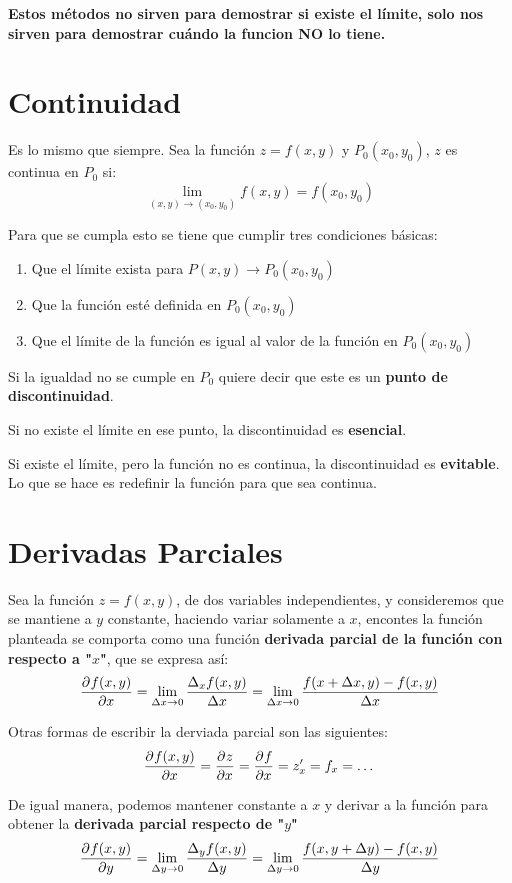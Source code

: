 \documentclass[12pt]{article}
\begin{document}
\textbf{Estos métodos no sirven para demostrar si existe el límite, solo nos sirven para demostrar cuándo la funcion NO lo tiene.}

\section{Continuidad}
Es lo mismo que siempre. Sea la función $ z = f(x,y) $ y $ P_{0}(x_{0}, y_{0}) $, $ z $ es continua en $ P_{0} $ si:
\[
\lim_{(x,y) \to (x_{0},y_{0})}{f(x,y)} = f(x_{0},y_{0})
\]

Para que se cumpla esto se tiene que cumplir tres condiciones básicas:
\begin{enumerate}[1.]
  \item Que el límite exista para $ P(x,y) \to P_{0}(x_{0},y_{0}) $

  \item Que la función esté definida en $ P_{0}(x_{0},y_{0}) $

  \item Que el límite de la función es igual al valor de la función en $ P_{0}(x_{0},y_{0}) $
\end{enumerate}

Si la igualdad no se cumple en $ P_{0} $ quiere decir que este es un \textbf{punto de discontinuidad}.

Si no existe el límite en ese punto, la discontinuidad es \textbf{esencial}.

Si existe el límite, pero la función no es continua, la discontinuidad es \textbf{evitable}. Lo que se hace es redefinir la función para que sea continua.

\section{Derivadas Parciales}
Sea la función $ z = f(x,y) $, de dos variables independientes, y consideremos que se mantiene a $ y $ constante, haciendo variar solamente a $ x $, encontes la función planteada se comporta como una función \textbf{derivada parcial de la función con respecto a "$ x $"}, que se expresa así:
\[
\pdv[]{f(x,y)}{x} = \lim_{\Delta x \to 0}{\frac{\Delta_{x}f(x,y)}{\Delta x}} = \lim_{\Delta x \to 0}{\frac{f(x + \Delta x,y) - f(x,y)}{\Delta x}}
\]

Otras formas de escribir la derviada parcial son las siguientes:
\[
\pdv[]{f(x,y)}{x} = \pdv[]{z}{x} = \pdv[]{f}{x} = z_{x}^\prime = f_{x} = \dots
\]

De igual manera, podemos mantener constante a $ x $ y derivar a la función para obtener la \textbf{derivada parcial respecto de "$ y $"}
\[
\pdv[]{f(x,y)}{y} = \lim_{\Delta y \to 0}{\frac{\Delta_{y}f(x,y)}{\Delta y}} = \lim_{\Delta y \to 0}{\frac{f(x,y + \Delta y) - f(x,y)}{\Delta y}}
\]
\end{document}
